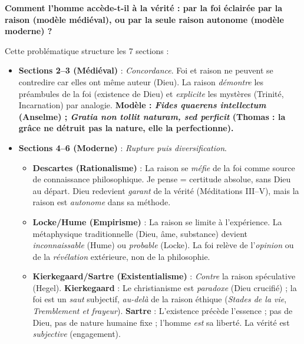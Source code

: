 \documentclass[11pt]{article}
\begin{document}
\begin{aretenir}
\textbf{Comment l'homme accède-t-il à la vérité : par la foi éclairée par la raison (modèle médiéval), ou par la seule raison autonome (modèle moderne) ?}
\par
Cette problématique structure les 7 sections :
\begin{itemize}
    \item \textbf{Sections 2--3 (Médiéval)} : \emph{Concordance}. Foi et raison ne peuvent se contredire car elles ont même auteur (Dieu). La raison \emph{démontre} les préambules de la foi (existence de Dieu) et \emph{explicite} les mystères (Trinité, Incarnation) par analogie. \textbf{Modèle : \emph{Fides quaerens intellectum} (Anselme) ; \emph{Gratia non tollit naturam, sed perficit} (Thomas : la grâce ne détruit pas la nature, elle la perfectionne).}
    \item \textbf{Sections 4--6 (Moderne)} : \emph{Rupture puis diversification}.
    \begin{itemize}
        \item \textbf{Descartes (Rationalisme)} : La raison se \emph{méfie} de la foi comme source de connaissance philosophique. \guillemotleft Je pense \guillemotright = certitude absolue, sans Dieu au départ. Dieu redevient \emph{garant} de la vérité (Méditations III--V), mais la raison est \emph{autonome} dans sa méthode.
        \item \textbf{Locke/Hume (Empirisme)} : La raison se limite à l'expérience. La métaphysique traditionnelle (Dieu, âme, substance) devient \emph{inconnaissable} (Hume) ou \emph{probable} (Locke). La foi relève de l'\emph{opinion} ou de la \emph{révélation} extérieure, non de la philosophie.
        \item \textbf{Kierkegaard/Sartre (Existentialisme)} : \emph{Contre} la raison spéculative (Hegel). \textbf{Kierkegaard} : Le christianisme est \emph{paradoxe} (Dieu crucifié) ; la foi est un \emph{saut} subjectif, \emph{au-delà} de la raison éthique (\emph{Stades de la vie}, \emph{Tremblement et frayeur}). \textbf{Sartre} : L'existence précède l'essence ; pas de Dieu, pas de nature humaine fixe ; l'homme \emph{est} sa liberté. La vérité est \emph{subjective} (engagement).
    \end{itemize}
\end{itemize}
\end{aretenir}
\end{document}
